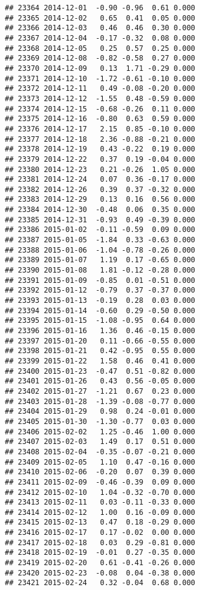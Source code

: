 \documentclass[
]{article}
\begin{document}
\begin{verbatim}
## 23364 2014-12-01  -0.90 -0.96  0.61 0.000
## 23365 2014-12-02   0.65  0.41  0.05 0.000
## 23366 2014-12-03   0.46  0.46  0.30 0.000
## 23367 2014-12-04  -0.17 -0.32  0.08 0.000
## 23368 2014-12-05   0.25  0.57  0.25 0.000
## 23369 2014-12-08  -0.82 -0.58  0.27 0.000
## 23370 2014-12-09   0.13  1.71 -0.29 0.000
## 23371 2014-12-10  -1.72 -0.61 -0.10 0.000
## 23372 2014-12-11   0.49 -0.08 -0.20 0.000
## 23373 2014-12-12  -1.55  0.48 -0.59 0.000
## 23374 2014-12-15  -0.68 -0.26  0.11 0.000
## 23375 2014-12-16  -0.80  0.63  0.59 0.000
## 23376 2014-12-17   2.15  0.85 -0.10 0.000
## 23377 2014-12-18   2.36 -0.88 -0.21 0.000
## 23378 2014-12-19   0.43 -0.22  0.19 0.000
## 23379 2014-12-22   0.37  0.19 -0.04 0.000
## 23380 2014-12-23   0.21 -0.26  1.05 0.000
## 23381 2014-12-24   0.07  0.36 -0.17 0.000
## 23382 2014-12-26   0.39  0.37 -0.32 0.000
## 23383 2014-12-29   0.13  0.16  0.56 0.000
## 23384 2014-12-30  -0.48  0.06  0.35 0.000
## 23385 2014-12-31  -0.93  0.49 -0.39 0.000
## 23386 2015-01-02  -0.11 -0.59  0.09 0.000
## 23387 2015-01-05  -1.84  0.33 -0.63 0.000
## 23388 2015-01-06  -1.04 -0.78 -0.26 0.000
## 23389 2015-01-07   1.19  0.17 -0.65 0.000
## 23390 2015-01-08   1.81 -0.12 -0.28 0.000
## 23391 2015-01-09  -0.85  0.01 -0.51 0.000
## 23392 2015-01-12  -0.79  0.37 -0.37 0.000
## 23393 2015-01-13  -0.19  0.28  0.03 0.000
## 23394 2015-01-14  -0.60  0.29 -0.50 0.000
## 23395 2015-01-15  -1.08 -0.95  0.64 0.000
## 23396 2015-01-16   1.36  0.46 -0.15 0.000
## 23397 2015-01-20   0.11 -0.66 -0.55 0.000
## 23398 2015-01-21   0.42 -0.95  0.55 0.000
## 23399 2015-01-22   1.58  0.46  0.41 0.000
## 23400 2015-01-23  -0.47  0.51 -0.82 0.000
## 23401 2015-01-26   0.43  0.56 -0.05 0.000
## 23402 2015-01-27  -1.21  0.67  0.23 0.000
## 23403 2015-01-28  -1.39 -0.08 -0.77 0.000
## 23404 2015-01-29   0.98  0.24 -0.01 0.000
## 23405 2015-01-30  -1.30 -0.77  0.03 0.000
## 23406 2015-02-02   1.25 -0.46  1.00 0.000
## 23407 2015-02-03   1.49  0.17  0.51 0.000
## 23408 2015-02-04  -0.35 -0.07 -0.21 0.000
## 23409 2015-02-05   1.10  0.47 -0.16 0.000
## 23410 2015-02-06  -0.20  0.07  0.39 0.000
## 23411 2015-02-09  -0.46 -0.39  0.09 0.000
## 23412 2015-02-10   1.04 -0.32 -0.70 0.000
## 23413 2015-02-11   0.03 -0.11 -0.33 0.000
## 23414 2015-02-12   1.00  0.16 -0.09 0.000
## 23415 2015-02-13   0.47  0.18 -0.29 0.000
## 23416 2015-02-17   0.17 -0.02  0.00 0.000
## 23417 2015-02-18   0.03  0.29 -0.81 0.000
## 23418 2015-02-19  -0.01  0.27 -0.35 0.000
## 23419 2015-02-20   0.61 -0.41 -0.26 0.000
## 23420 2015-02-23  -0.08  0.04 -0.38 0.000
## 23421 2015-02-24   0.32 -0.04  0.68 0.000

\end{verbatim}
\end{document}
